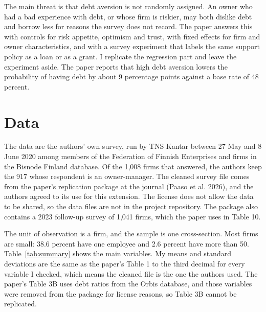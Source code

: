 \documentclass[preprint,letterpaper,11pt,authoryear]{elsarticle}
\begin{document}
The main threat is that debt aversion is not randomly assigned. An owner who had a bad experience with debt, or whose firm is riskier, may both dislike debt and borrow less for reasons the survey does not record. The paper answers this with controls for risk appetite, optimism and trust, with fixed effects for firm and owner characteristics, and with a survey experiment that labels the same support policy as a loan or as a grant. I replicate the regression part and leave the experiment aside. The paper reports that high debt aversion lowers the probability of having debt by about 9 percentage points against a base rate of 48 percent.

\section{Data}

The data are the authors' own survey, run by TNS Kantar between 27 May and 8 June 2020 among members of the Federation of Finnish Enterprises and firms in the Bisnode Finland database. Of the 1,008 firms that answered, the authors keep the 917 whose respondent is an owner-manager. The cleaned survey file comes from the paper's replication package at the journal (Paaso et al. 2026), and the authors agreed to its use for this extension. The license does not allow the data to be shared, so the data files are not in the project repository. The package also contains a 2023 follow-up survey of 1,041 firms, which the paper uses in Table 10.

The unit of observation is a firm, and the sample is one cross-section. Most firms are small: 38.6 percent have one employee and 2.6 percent have more than 50. Table~\ref{tab:summary} shows the main variables. My means and standard deviations are the same as the paper's Table 1 to the third decimal for every variable I checked, which means the cleaned file is the one the authors used. The paper's Table 3B uses debt ratios from the Orbis database, and those variables were removed from the package for license reasons, so Table 3B cannot be replicated.
\end{document}

